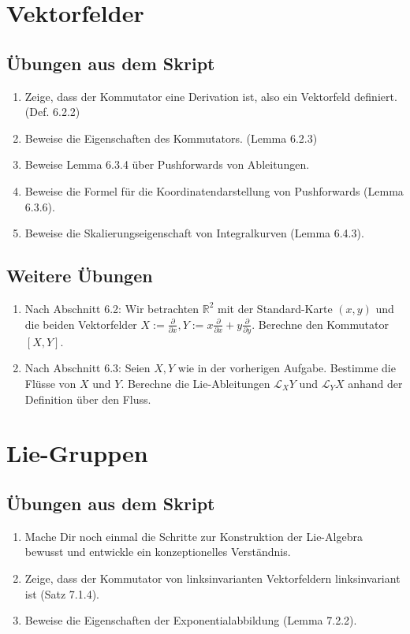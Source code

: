 \documentclass[a4paper,headsepline,headheight=30pt,numbers=enddot]{scrartcl}
\newcommand{\R}{\mathbb{R}}
\begin{document}
	\section{Vektorfelder}
	\subsection*{Übungen aus dem Skript}
	\begin{enumerate}
		\item Zeige, dass der Kommutator eine Derivation ist, also ein Vektorfeld definiert. (Def. 6.2.2)
		\item Beweise die Eigenschaften des Kommutators. (Lemma 6.2.3)
		\item Beweise Lemma 6.3.4 über Pushforwards von Ableitungen.
		\item Beweise die Formel für die Koordinatendarstellung von Pushforwards (Lemma 6.3.6).
		\item Beweise die Skalierungseigenschaft von Integralkurven (Lemma 6.4.3).
	\end{enumerate}
	\subsection*{Weitere Übungen}
	\begin{enumerate}
		\item Nach Abschnitt 6.2: Wir betrachten $\R^2$ mit der Standard-Karte $(x,y)$ und die beiden Vektorfelder $X := \frac{\partial}{\partial x}, Y := x \frac{\partial}{\partial x} + y \frac{\partial}{\partial y}$. Berechne den Kommutator $[X,Y]$.
		\item Nach Abschnitt 6.3: Seien $X,Y$ wie in der vorherigen Aufgabe. Bestimme die Flüsse von $X$ und $Y$. Berechne die Lie-Ableitungen $\mathcal L_X Y$ und $\mathcal L_Y X$ anhand der Definition über den Fluss.
	\end{enumerate}

	\newpage
	\section{Lie-Gruppen}
	\subsection*{Übungen aus dem Skript}
	\begin{enumerate}
		\item Mache Dir noch einmal die Schritte zur Konstruktion der Lie-Algebra bewusst und entwickle ein konzeptionelles Verständnis.
		\item Zeige, dass der Kommutator von linksinvarianten Vektorfeldern linksinvariant ist (Satz 7.1.4).
		\item Beweise die Eigenschaften der Exponentialabbildung (Lemma 7.2.2).
	\end{enumerate}
\end{document}
